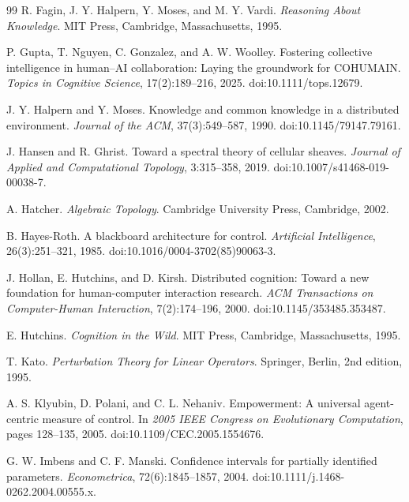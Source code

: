 \documentclass[11pt,letterpaper]{article}
\theoremstyle{plain}
\theoremstyle{definition}
\begin{document}
\begin{thebibliography}{99}
R. Fagin, J. Y. Halpern, Y. Moses, and M. Y. Vardi.
\newblock \emph{Reasoning About Knowledge}.
\newblock MIT Press, Cambridge, Massachusetts, 1995.

P. Gupta, T. Nguyen, C. Gonzalez, and A. W. Woolley.
\newblock Fostering collective intelligence in human--AI collaboration: Laying the groundwork for COHUMAIN.
\newblock \emph{Topics in Cognitive Science}, 17(2):189--216, 2025.
\newblock doi:10.1111/tops.12679.

J. Y. Halpern and Y. Moses.
\newblock Knowledge and common knowledge in a distributed environment.
\newblock \emph{Journal of the ACM}, 37(3):549--587, 1990.
\newblock doi:10.1145/79147.79161.

J. Hansen and R. Ghrist.
\newblock Toward a spectral theory of cellular sheaves.
\newblock \emph{Journal of Applied and Computational Topology}, 3:315--358, 2019.
\newblock doi:10.1007/s41468-019-00038-7.

A. Hatcher.
\newblock \emph{Algebraic Topology}.
\newblock Cambridge University Press, Cambridge, 2002.

B. Hayes-Roth.
\newblock A blackboard architecture for control.
\newblock \emph{Artificial Intelligence}, 26(3):251--321, 1985.
\newblock doi:10.1016/0004-3702(85)90063-3.

J. Hollan, E. Hutchins, and D. Kirsh.
\newblock Distributed cognition: Toward a new foundation for human-computer interaction research.
\newblock \emph{ACM Transactions on Computer-Human Interaction}, 7(2):174--196, 2000.
\newblock doi:10.1145/353485.353487.

E. Hutchins.
\newblock \emph{Cognition in the Wild}.
\newblock MIT Press, Cambridge, Massachusetts, 1995.

T. Kato.
\newblock \emph{Perturbation Theory for Linear Operators}.
\newblock Springer, Berlin, 2nd edition, 1995.

A. S. Klyubin, D. Polani, and C. L. Nehaniv.
\newblock Empowerment: A universal agent-centric measure of control.
\newblock In \emph{2005 IEEE Congress on Evolutionary Computation}, pages 128--135, 2005.
\newblock doi:10.1109/CEC.2005.1554676.

G. W. Imbens and C. F. Manski.
\newblock Confidence intervals for partially identified parameters.
\newblock \emph{Econometrica}, 72(6):1845--1857, 2004.
\newblock doi:10.1111/j.1468-0262.2004.00555.x.


\end{thebibliography}
\end{document}
